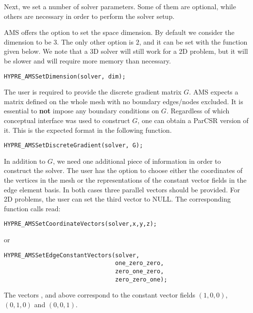 Next, we set a number of solver parameters. Some of them are
optional, while others are necessary in order to perform the
solver setup.

AMS offers the option to set the space dimension.
By default we consider the dimension to be $3$. The only
other option is $2$, and it can be set with the function given below.
We note that a 3D solver will still work for a 2D problem,
but it will be slower and will require more memory than necessary.
\begin{display}\begin{verbatim}
HYPRE_AMSSetDimension(solver, dim);
\end{verbatim}\end{display}

The user is required to provide the discrete gradient matrix $G$.
AMS expects a matrix defined on the whole mesh with no
boundary edges/nodes excluded. It is essential to {\bf not} impose any boundary
conditions on $G$.
Regardless of which \hypre{} conceptual interface was used to construct $G$,
one can obtain a ParCSR version of it. This is the expected
format in the following function.
\begin{display}\begin{verbatim}
HYPRE_AMSSetDiscreteGradient(solver, G);
\end{verbatim}\end{display}

In addition to $G$, we need one additional piece of information in order
to construct the solver.
The user has the option to choose either the coordinates of the vertices
in the mesh or the representations of the constant vector fields
in the edge element basis.
In both cases three \hypre{} parallel vectors should be provided.
For 2D problems, the user can set the third vector to NULL.
The corresponding function calls read:
\begin{display}\begin{verbatim}
HYPRE_AMSSetCoordinateVectors(solver,x,y,z);
\end{verbatim}\end{display}
or
\begin{display}\begin{verbatim}
HYPRE_AMSSetEdgeConstantVectors(solver,
                                one_zero_zero,
                                zero_one_zero,
                                zero_zero_one);
\end{verbatim}\end{display}
The vectors ,  and 
above correspond to the constant vector fields $(1,0,0)$, $(0,1,0)$ and $(0,0,1)$.

